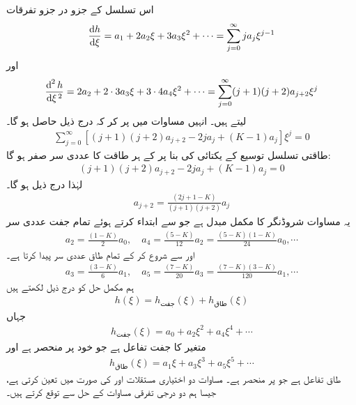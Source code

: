  اس تسلسل کے جزو در جزو تفرقات
\begin{align*}
\frac{\dif{h}}{\dif{\xi}}=a_{1}+2a_{2}\xi+3a_{3}\xi^{2}+\cdots =\sum_{j=0}^{\infty}ja_{j}\xi^{j-1}
\end{align*}
اور
\begin{align*}
\frac{\dif^{\,2}{h}}{\dif{\xi^{\,2}}}=2a_{2}+2\cdot 3a_{3}\xi+3\cdot 4a_{4}\xi^{2}+\cdots =\sum_{j=0}^{\infty}(j+1)(j+2)a_{j+2}\xi^{j}
\end{align*}
لیتے ہیں۔ انہیں مساوات  میں پر کر کہ درج ذیل حاصل ہو گا۔
\begin{align}
\sum_{j=0}^{\infty}[(j+1)(j+2)a_{j+2}-2ja_{j}+(K-1)a_{j}]\xi^{j}=0
\end{align}
طاقتی تسلسل  توسیع  کے یکتائی کی بنا پر  کے ہر طاقت کا عددی سر صفر ہو گا:
\begin{align*}
(j+1)(j+2)a_{j+2}-2ja_{j}+(K-1)a_{j}=0
\end{align*}
لہٰذا درج ذیل ہو گا۔
\begin{align}\label{مساوات_شروڈنگر_کلیہ_توالی_الف}
a_{j+2}=\frac{(2j+1-K)}{(j+1)(j+2)}a_{j}
\end{align}
یہ  مساوات شروڈنگر کا مکمل مبدل ہے جو  سے ابتداء کرتے ہوئے تمام جفت عددی سر
\begin{align*}
a_{2}=\frac{(1-K)}{2}a_{0}, \quad a_{4}=\frac{(5-K)}{12}a_{2}=\frac{(5-K)(1-K)}{24}a_{0},\cdots
\end{align*}
اور  سے شروع کر کے تمام طاق عددی سر پیدا کرتا ہے۔
\begin{align*}
a_{3}=\frac{(3-K)}{6}a_{1},\quad a_{5}=\frac{(7-K)}{20}a_{3}=\frac{(7-K)(3-K)}{120}a_{1},\cdots
\end{align*}
ہم مکمل حل کو درج ذیل لکھتے ہیں
\begin{align}\label{مساوات_شروڈنگر_کلیہ_توالی_ب}
h(\xi)=h_{\text{جفت}}(\xi)+h_{\text{طاق}}(\xi)
\end{align}
جہاں 
\begin{align*}
h_{\text{جفت}}(\xi)=a_{0}+a_{2}\xi^{2}+a_{4}\xi^{4}+\cdots
\end{align*}
متغیر  کا جفت تفاعل ہے جو خود  پر منحصر ہے اور 
\begin{align*}
h_{\text{طاق}}(\xi)=a_{1}\xi+a_{3}\xi^{3}+a_{5}\xi^{5}+\cdots
\end{align*}
طاق تفاعل ہے جو  پر منحصر ہے۔ مساوات  دو اختیاری مستقلات 
اور  کی صورت میں  تعین کرتی ہے، جیسا ہم دو درجی تفرقی مساوات کے حل سے توقع کرتے ہیں۔


